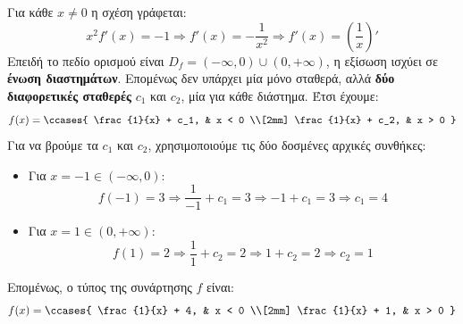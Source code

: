 
\lysh
Για κάθε $x \neq 0$ η σχέση γράφεται:
\[ x^2 f'(x) = -1 \Rightarrow f'(x) = -\frac{1}{x^2} \Rightarrow f'(x) = \left(\frac{1}{x}\right)' \]
Επειδή το πεδίο ορισμού είναι $D_f = (-\infty, 0) \cup (0, +\infty)$, η εξίσωση ισχύει σε \textbf{ένωση διαστημάτων}. Επομένως δεν υπάρχει μία μόνο σταθερά, αλλά \textbf{δύο διαφορετικές σταθερές} $c_1$ και $c_2$, μία για κάθε διάστημα. Έτσι έχουμε:
\[ f(x) = \ccases{ \frac{1}{x} + c_1, & x < 0 \\[2mm] \frac{1}{x} + c_2, & x > 0 } \]
Για να βρούμε τα $c_1$ και $c_2$, χρησιμοποιούμε τις δύο δοσμένες αρχικές συνθήκες:
\begin{itemize}
    \item Για $x = -1 \in (-\infty, 0)$:
    \[ f(-1) = 3 \Rightarrow \frac{1}{-1} + c_1 = 3 \Rightarrow -1 + c_1 = 3 \Rightarrow c_1 = 4 \]
    \item Για $x = 1 \in (0, +\infty)$:
    \[ f(1) = 2 \Rightarrow \frac{1}{1} + c_2 = 2 \Rightarrow 1 + c_2 = 2 \Rightarrow c_2 = 1 \]
\end{itemize}
Επομένως, ο τύπος της συνάρτησης $f$ είναι:
\[ f(x) = \ccases{ \frac{1}{x} + 4, & x < 0 \\[2mm] \frac{1}{x} + 1, & x > 0 } \]

